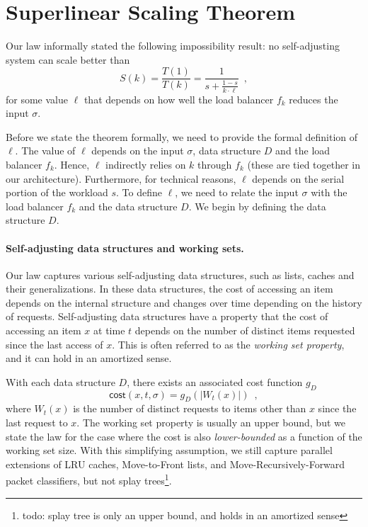 \appendix





\section{Superlinear Scaling Theorem}
\label{sec:apx}

Our law informally stated the following impossibility result: no self-adjusting system can scale better than
\begin{equation*}
  S(k) = \frac{T(1)}{T(k)} = \frac1{s + \frac{1-s}{k \cdot \ell}} \enspace ,
\end{equation*}
for some value $\ell$ that depends on how well the load balancer $f_k$ reduces the input $\sigma$.

Before we state the theorem formally, we need to provide the formal definition of $\ell$.
The value of $\ell$ depends on the input $\sigma$, data structure $D$ and the load balancer $f_k$. Hence, $\ell$ indirectly relies on $k$ through $f_k$ (these are tied together in our architecture). Furthermore, for technical reasons, $\ell$ depends on the serial portion of the workload $s$.
To define $\ell$, we need to relate the input $\sigma$ with the load balancer $f_k$ and the data structure $D$.
We begin by defining the data structure $D$.



\paragraph*{Self-adjusting data structures and working sets.}
Our law captures various self-adjusting data structures, such as lists, caches and their generalizations.
In these data structures, the cost of accessing an item depends on the internal structure and changes over time depending on the history of requests.
Self-adjusting data structures have a property that the cost of accessing an item $x$ at time $t$ depends on the number of distinct items requested since the last access of $x$.
This is often referred to as the \emph{working set property}, and it can hold in an amortized sense.

With each data structure $D$, there exists an associated cost function $g_D$ 
\[
	\textsf{cost}(x, t, \sigma) = g_D(|W_t(x)|) \enspace ,
\]
where $W_t(x)$ is the number of distinct requests to items other than $x$ since the last request to $x$.
The working set property is usually an upper bound, but we state the law for the case where the cost is also \emph{lower-bounded} as a function of the working set size.
With this simplifying assumption, we still capture parallel extensions of LRU caches, Move-to-Front lists, and Move-Recursively-Forward packet classifiers, but not splay trees\footnote{todo: splay tree is only an upper bound, and holds in an amortized sense}. 

